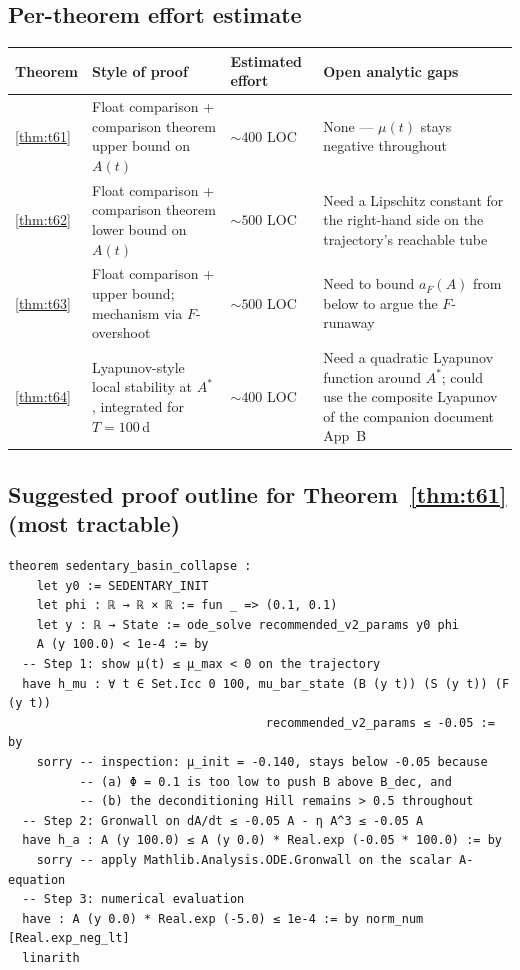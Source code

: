 \documentclass[11pt,a4paper]{article}
\theoremstyle{definition}
\begin{document}
\subsection{Per-theorem effort estimate}

\begin{center}\small
\begin{tabular}{llll}
\toprule
Theorem & Style of proof & Estimated effort & Open analytic gaps \\
\midrule
\ref{thm:t61}    & Float comparison + comparison theorem upper bound on $A(t)$ & $\sim 400$ LOC & None — $\mu(t)$ stays negative throughout \\
\ref{thm:t62}    & Float comparison + comparison theorem lower bound on $A(t)$ & $\sim 500$ LOC & Need a Lipschitz constant for the right-hand side on the trajectory's reachable tube \\
\ref{thm:t63}    & Float comparison + upper bound; mechanism via $F$-overshoot & $\sim 500$ LOC & Need to bound $a_F(A)$ from below to argue the $F$-runaway \\
\ref{thm:t64}    & Lyapunov-style local stability at $A^*$, integrated for $T = 100$\,d & $\sim 400$ LOC & Need a quadratic Lyapunov function around $A^*$; could use the composite Lyapunov of the companion document App~B \\
\bottomrule
\end{tabular}
\end{center}

\subsection{Suggested proof outline for Theorem~\ref{thm:t61} (most tractable)}

\begin{lstlisting}[language={}]
theorem sedentary_basin_collapse :
    let y0 := SEDENTARY_INIT
    let phi : ℝ → ℝ × ℝ := fun _ => (0.1, 0.1)
    let y : ℝ → State := ode_solve recommended_v2_params y0 phi
    A (y 100.0) < 1e-4 := by
  -- Step 1: show μ(t) ≤ μ_max < 0 on the trajectory
  have h_mu : ∀ t ∈ Set.Icc 0 100, mu_bar_state (B (y t)) (S (y t)) (F (y t))
                                    recommended_v2_params ≤ -0.05 := by
    sorry -- inspection: μ_init = -0.140, stays below -0.05 because
          -- (a) Φ = 0.1 is too low to push B above B_dec, and
          -- (b) the deconditioning Hill remains > 0.5 throughout
  -- Step 2: Gronwall on dA/dt ≤ -0.05 A - η A^3 ≤ -0.05 A
  have h_a : A (y 100.0) ≤ A (y 0.0) * Real.exp (-0.05 * 100.0) := by
    sorry -- apply Mathlib.Analysis.ODE.Gronwall on the scalar A-equation
  -- Step 3: numerical evaluation
  have : A (y 0.0) * Real.exp (-5.0) ≤ 1e-4 := by norm_num [Real.exp_neg_lt]
  linarith
\end{lstlisting}
\end{document}
